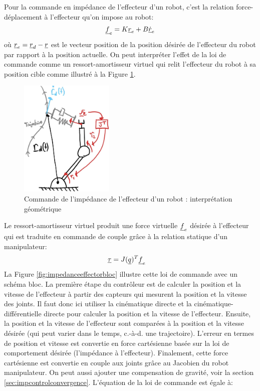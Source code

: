 Pour la commande en impédance de l'effecteur d'un robot, c'est la relation force-déplacement à l'effecteur qu'on impose au robot:
\begin{align}
	\underline{f}_e  =  K \underline{r}_e + B \underline{\dot{r}}_e
\end{align}
où $\underline{r}_e = \underline{r}_d - \underline{r} $ est le vecteur position de la position désirée de l'effecteur du robot par rapport à la position actuelle. On peut interpréter l'effet de la loi de commande comme un ressort-amortisseur virtuel qui relit l'effecteur du robot à sa position cible comme illustré à la Figure \ref{fig:impedanceeffectorgeo}.
\begin{figure}[h]
	\centering
	\includegraphics[width=0.4\textwidth]{fig/impedancecontroleffectorgeo.jpg}
	\caption{Commande de l'impédance de l'effecteur d'un robot : interprétation géométrique}
	\label{fig:impedanceeffectorgeo}
\end{figure}
Le ressort-amortisseur virtuel produit une force virtuelle $\underline{f}_e$ désirée à l'effecteur qui est traduite en commande de couple grâce à la relation statique d'un manipulateur:
\begin{align}
	\underline{\tau} &= J(\underline{q})^T \underline{f}_e
\end{align}
La Figure \ref{fig:impedanceeffectorbloc} illustre cette loi de commande avec un schéma bloc. La première étape du contrôleur est de calculer la position et la vitesse de l'effecteur à partir des capteurs qui mesurent la position et la vitesse des joints. Il faut donc ici utiliser la cinématique directe et la cinématique-différentielle directe pour calculer la position et la vitesse de l'effecteur. Ensuite, la position et la vitesse de l'effecteur sont comparées à la position et la vitesse désirée (qui peut varier dans le temps, c.-à-d. une trajectoire). L'erreur en termes de position et vitesse est convertie en force cartésienne basée sur la loi de comportement désirée (l'impédance à l'effecteur). Finalement, cette force cartésienne est convertie en couple aux joints grâce au Jacobien du robot manipulateur. On peut aussi ajouter une compensation de gravité, voir la section \ref{sec:impcontrolconvergence}. L'équation de la loi de commande est égale à:
